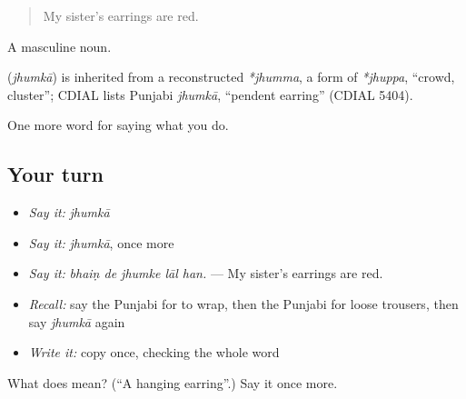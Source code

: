 \begin{quote}
My sister's earrings are red.
\end{quote}

A masculine noun.

\begin{cousinweb}
\textbf{} (\emph{jhumkā}) is inherited from a reconstructed \emph{*jhumma}, a form of \emph{*jhuppa}, \textquotedblleft{}crowd, cluster\textquotedblright{}; CDIAL lists Punjabi \emph{jhumkā}, \textquotedblleft{}pendent earring\textquotedblright{} (CDIAL 5404).
\end{cousinweb}

\begin{grammarlens}[title={What you've built}]
One more word for saying what you do.
\end{grammarlens}

\subsection*{Your turn}
\begin{itemize}
\raggedright
  \item \emph{Say it:} \emph{jhumkā}
  \item \emph{Say it:} \emph{jhumkā}, once more
  \item \emph{Say it:} \emph{bhaiṇ de jhumke lāl han.} — My sister's earrings are red.
  \item \emph{Recall:} say the Punjabi for to wrap, then the Punjabi for loose trousers, then say \emph{jhumkā} again
  \item \emph{Write it:} copy \textbf{} once, checking the whole word
\end{itemize}

\begin{tcolorbox}[breakable,colback=teal!4,colframe=teal!35!black,title={Before you move on}]
What does  mean? (\textquotedblleft{}A hanging earring\textquotedblright{}.) Say it once more.
\end{tcolorbox}
